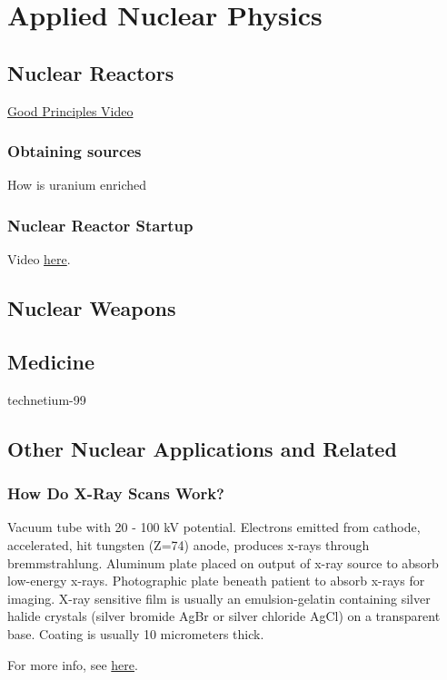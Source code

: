 \chapter{Applied Nuclear Physics}
    \section{Nuclear Reactors}
        \href{https://www.youtube.com/watch?v=gGJKevXzN9A&list=RDCMUCIVaddFslWk1TFoKNrvh99Q&index=20}{Good Principles Video}
        \subsection{Obtaining sources}
            How is uranium enriched
        \subsection{Nuclear Reactor Startup}
            Video \href{https://en.wikipedia.org/wiki/Startup_neutron_source}{here}.
            
            
    \section{Nuclear Weapons}
    
    \section{Medicine}
        technetium-99
        
    \section{Other Nuclear Applications and Related}
        \subsection{How Do X-Ray Scans Work?}
            \indent Vacuum tube with 20 - 100 kV potential. Electrons emitted from cathode, accelerated, hit tungsten (Z=74) anode, produces x-rays through bremmstrahlung. Aluminum plate placed on output of x-ray source to absorb low-energy x-rays. Photographic plate beneath patient to absorb x-rays for imaging. X-ray sensitive film is usually an emulsion-gelatin containing silver halide crystals (silver bromide AgBr or silver chloride AgCl) on a transparent base. Coating is usually 10 micrometers thick. 
            
            For more info, see \href{https://www.youtube.com/watch?v=nSivTK6Icu4}{here}. 
            
